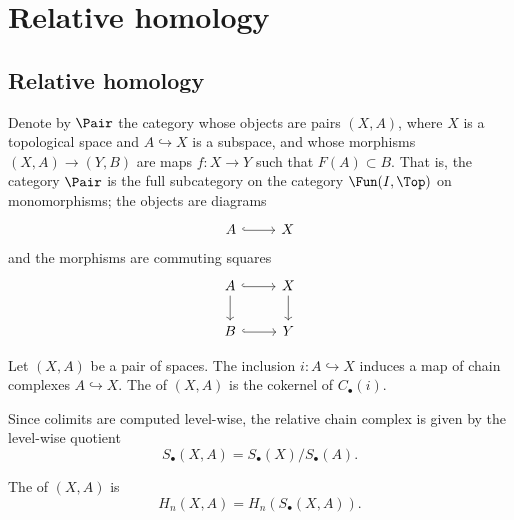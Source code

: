 \documentclass[main.tex]{subfiles}
\begin{document}
\section{Relative homology}
\label{sec:relative_homology}

\subsection{Relative homology}
\label{ssc:relative_homology}

Denote by $\Pair$ the category whose objects are pairs $(X, A)$, where $X$ is a topological space and $A \hookrightarrow X$ is a subspace, and whose morphisms $(X, A) \to (Y, B)$ are maps $f\colon X \to Y$ such that $F(A) \subset B$. That is, the category \(\Pair\) is the full subcategory on the category \(\Fun(I, \Top)\) on monomorphisms; the objects are diagrams
\begin{equation*}
  \begin{tikzcd}
    A
    \arrow[r, hookrightarrow]
    & X
  \end{tikzcd}
\end{equation*}
and the morphisms are commuting squares
\begin{equation*}
  \begin{tikzcd}
    A
    \arrow[r, hookrightarrow]
    \arrow[d]
    & X
    \arrow[d]
    \\
    B
    \arrow[r, hookrightarrow]
    & Y
  \end{tikzcd}
\end{equation*}

\begin{definition}
  \label{def:relative_homology}
  Let $(X, A)$ be a pair of spaces. The inclusion $i\colon A \hookrightarrow X$ induces a map of chain complexes $A \hookrightarrow X$. The  of $(X, A)$ is the cokernel of $C_{\bullet}(i)$.

  Since colimits are computed level-wise, the relative chain complex is given by the level-wise quotient
  \begin{equation*}
    S_{\bullet}(X, A) = S_{\bullet}(X) / S_{\bullet}(A).
  \end{equation*}

  The  of $(X, A)$ is
  \begin{equation*}
    H_{n}(X, A) = H_{n}(S_{\bullet}(X, A)).
  \end{equation*}
\end{definition}
\end{document}
